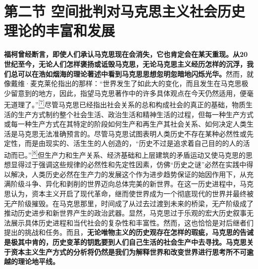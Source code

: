 \documentclass[UTF8, fontset = sourcesans, a4paper, oneside, zihao =
-4, scheme=chinese, no-math, space=true]{ctexbook}
\begin{document}
\protect\hypertarget{part0010_split_002.html}{}{}

\hypertarget{part0010_split_002.htmlux5cux23b019}{\section{第二节
空间批判对马克思主义社会历史理论的丰富和发展}\label{part0010_split_002.htmlux5cux23b019}}

\textbf{福柯曾经断言，即使人们承认马克思现在会消失，它也肯定会在某天重现。从20世纪至今，无论人们怎样褒扬或诋毁马克思，无论马克思主义经历怎样的沉浮，我们总可以在浩如烟海的理论著述中看到马克思思想忽明忽暗地闪烁光华。}然而，就像戴维·麦克莱伦指出的那样：``世界发生了如此大的变化，而且发生在马克思极少留意到的地方，因此，指望马克思著作中的许多具体观点在今天仍然适用，便毫无道理了。''\protect\hypertarget{part0010_split_002.htmlux5cux23w7}{}{}\protect\hyperlink{part0010_split_002.htmlux5cux23m7}{\textsuperscript{{[}7{]}}}尽管马克思已经指出社会关系的总和构成社会的真正的基础，物质生活的生产方式制约整个社会生活、政治生活和精神生活的过程，但每一种生产方式或每一种生产方式在其特定的阶段如何生产和再生产其社会关系、如何决定人类生活是马克思无法准确预言的。尽管马克思试图表明人类历史不存在某种必然性或先定性，而是由现实的、活生生的人创造的，``历史不过是追求着自己目的的人的活动而已。''\protect\hypertarget{part0010_split_002.htmlux5cux23w8}{}{}\protect\hyperlink{part0010_split_002.htmlux5cux23m8}{\textsuperscript{{[}8{]}}}但生产力和生产关系、经济基础和上层建筑的矛盾运动又使马克思的思想显得过于强调这些规律的必然性和先定性因素，仿佛``历史之谜''必然在实践中得以解决，人类历史必然在生产力的发展这个作为进步趋势保证的始因作用下，从充满阶级斗争、异化和剥削的世界迈向总体完美的新世界。在这一历史进程中，马克思认为，资本主义开启了现代革命，继而使世界成为一个彻底现代的世界并最终被无产阶级摧毁。在马克思那里，时间成了从过去过渡到未来的桥梁，无产阶级成了推动历史进步和新世界产生的政治武器。显然，马克思过于乐观的宏大历史叙事无法展示具体历史进程和当代社会的复杂性和丰富性。然而，这也恰恰是对后继者们提出的挑战和任务。而且，\textbf{无论唯物主义的历史观存在怎样的瑕疵，马克思的告诫是极其中肯的，历史变革的钥匙要到人们自己生活的社会生产中去寻找。马克思关于资本主义生产方式的分析将仍然是我们为解释世界和改变世界进行思考所不可逾越的理论地平线。}
\end{document}
